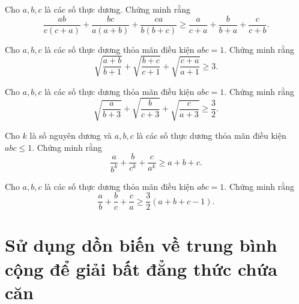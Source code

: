 {\begin{bt}%
	[Moldova, 1999] Cho $a, b, c$ là các số thực dương. Chứng minh rằng
	$$ \frac{{ab}}{{c\left( {c + a} \right)}} + \frac{{bc}}{{a\left( {a + b} \right)}} + \frac{{ca}}{{b\left( {b + c} \right)}} \ge \frac{a}{{c + a}} + \frac{b}{{b + a}} + \frac{c}{{c + b}}.  $$
\end{bt}

\begin{bt}%
	Cho $a, b, c$ là các số thực dương thỏa mãn điều kiện $abc = 1$. Chứng minh rằng
	$$ \sqrt {\frac{{a + b}}{{b + 1}}}  + \sqrt {\frac{{b + c}}{{c + 1}}}  + \sqrt {\frac{{c + a}}{{a + 1}}}  \ge 3. $$
\end{bt}

\begin{bt}%
	Cho $a, b, c$ là các số thực dương thỏa mãn điều kiện $abc = 1$. Chứng minh rằng
	$$ \sqrt {\frac{{a }}{{b + 3}}}  + \sqrt {\frac{{b }}{{c + 3}}}  + \sqrt {\frac{{c }}{{a + 3}}}  \ge \dfrac{3}{2}. $$
\end{bt}

\begin{bt}%
	[T7/375, THTT] Cho $k$ là số nguyên dương và $a, b, c$ là các số thực dương thỏa mãn điều kiện $abc \le 1$. Chứng minh rằng
	$$ \frac{a}{{{b^k}}} + \frac{b}{{{c^k}}} + \frac{c}{{{a^k}}} \ge a + b + c. $$
\end{bt}

\begin{bt}%
	[T4/376, THTT] Cho  $a, b, c$ là các số thực dương thỏa mãn điều kiện $abc = 1$. Chứng minh rằng
	$$ \frac{a}{b} + \frac{b}{c} + \frac{c}{a} \ge \frac{3}{2}\left( {a + b + c - 1} \right). $$
\end{bt}

\section{Sử dụng dồn biến về trung bình cộng để giải bất đẳng thức chứa căn}
\begin{center}
	\textbf{\color{violet}{Phạm Thanh Hùng\\
			(GV Đại học Kiên Giang)}}
\end{center}
}
